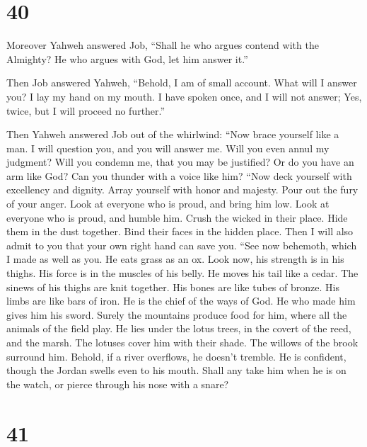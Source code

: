 \hypertarget{section-39}{%
\section{40}\label{section-39}}

 Moreover Yahweh answered Job,  ``Shall he
who argues contend with the Almighty? He who argues with God, let him
answer it.''

 Then Job answered Yahweh,  ``Behold, I am
of small account. What will I answer you? I lay my hand on my mouth.
 I have spoken once, and I will not answer; Yes, twice,
but I will proceed no further.''

 Then Yahweh answered Job out of the whirlwind:
 ``Now brace yourself like a man. I will question you, and
you will answer me.  Will you even annul my judgment? Will
you condemn me, that you may be justified?  Or do you have
an arm like God? Can you thunder with a voice like him? 
``Now deck yourself with excellency and dignity. Array yourself with
honor and majesty.  Pour out the fury of your anger. Look
at everyone who is proud, and bring him low.  Look at
everyone who is proud, and humble him. Crush the wicked in their place.
 Hide them in the dust together. Bind their faces in the
hidden place.  Then I will also admit to you that your
own right hand can save you.  ``See now behemoth, which I
made as well as you. He eats grass as an ox.  Look now,
his strength is in his thighs. His force is in the muscles of his belly.
 He moves his tail like a cedar. The sinews of his thighs
are knit together.  His bones are like tubes of bronze.
His limbs are like bars of iron.  He is the chief of the
ways of God. He who made him gives him his sword.  Surely
the mountains produce food for him, where all the animals of the field
play.  He lies under the lotus trees, in the covert of
the reed, and the marsh.  The lotuses cover him with
their shade. The willows of the brook surround him. 
Behold, if a river overflows, he doesn't tremble. He is confident,
though the Jordan swells even to his mouth.  Shall any
take him when he is on the watch, or pierce through his nose with a
snare?

\hypertarget{section-40}{%
\section{41}\label{section-40}}

